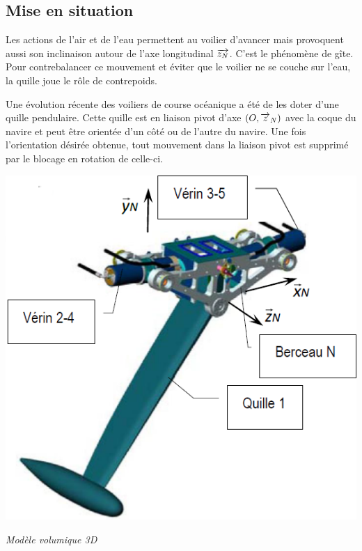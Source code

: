 \documentclass[10pt,fleqn]{article} %
\begin{document}

\vspace{4.5cm}
\pagestyle{fancy}
\thispagestyle{plain}


\def\columnseprulecolor{\color{ocre}}
\setlength{\columnseprule}{0.4pt} 

\ifprof
\begin{multicols}{2}
\else
\begin{multicols}{2}
\fi

\section*{Mise en situation}
\ifprof
\else

Les actions de l'air et de l'eau permettent au voilier d'avancer mais provoquent aussi son inclinaison autour de l'axe longitudinal $\overrightarrow{z_N}$. C’est le phénomène de gîte. Pour contrebalancer ce mouvement et éviter que le voilier ne se couche sur l’eau, la quille joue le rôle de contrepoids. 



Une évolution récente des voiliers de course océanique a été de les doter d’une quille pendulaire. Cette quille est en liaison pivot d’axe $\left(O,\overrightarrow{z}_N \right)$ avec la coque du navire et peut être orientée d’un côté ou de l’autre du navire. Une fois l’orientation désirée obtenue, tout mouvement dans la liaison pivot est supprimé par le blocage en rotation de celle-ci. 

\begin{center}
\includegraphics[width=.6\linewidth]{images/fig_03}

\textit{Modèle volumique 3D}
\end{center}



\end{multicols}
\end{multicols}
\end{document}
